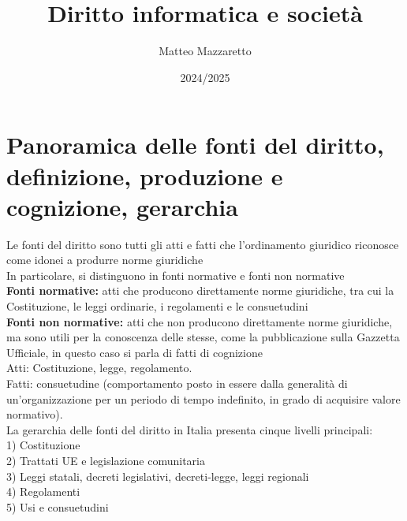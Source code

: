 \documentclass[8pt,oneside,a4paper]{article}
\title{Diritto informatica e società}
\author{Matteo Mazzaretto}
\date{2024/2025}
\begin{document}
	\maketitle
	\begin{center}
		\renewcommand{\contentsname}{Indice}
		\tableofcontents
	\end{center}
	\newpage
	\setcounter{page}{1}
	\section{Panoramica delle fonti del diritto, definizione, produzione e cognizione, gerarchia}
	Le fonti del diritto sono tutti gli atti e fatti che l'ordinamento giuridico riconosce come idonei a produrre norme giuridiche\\
	In particolare, si distinguono in fonti normative e fonti non normative\\
	\textbf{Fonti normative:} atti che producono direttamente norme giuridiche, tra cui la Costituzione, le leggi ordinarie, i regolamenti e le consuetudini\\
	\textbf{Fonti non normative:} atti che non producono direttamente norme giuridiche, ma sono utili per la conoscenza delle stesse, come la pubblicazione sulla Gazzetta Ufficiale, in questo caso si parla di fatti di cognizione\\
	Atti: Costituzione, legge, regolamento.\\
	Fatti: consuetudine (comportamento posto in essere dalla generalità di un'organizzazione per un periodo di tempo indefinito, in grado di acquisire valore normativo).\\
	La gerarchia delle fonti del diritto in Italia presenta cinque livelli principali:\\
	1) Costituzione\\
	2) Trattati UE e legislazione comunitaria\\
	3) Leggi statali, decreti legislativi, decreti-legge, leggi regionali\\
	4) Regolamenti\\
	5) Usi e consuetudini
\end{document}

